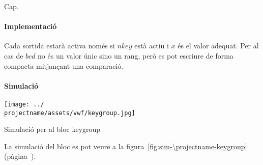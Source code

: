 Cap.

\paragraph{Implementació}




Cada sortida estarà activa només si $nkey$ està actiu i $x$ és el valor adequat.
Per al cas de $bcd$ no és un valor únic sino un rang, però es pot escriure de
forma compacta mitjançant una comparació.

\paragraph{Simulació}

\begin{contendfig}
  \begin{center}
    \texttt{[image: ../\\projectname/assets/vwf/keygroup.jpg]}
  \end{center}
  \caption{\label{fig:sim-\projectname-keygroup} Simulació per al bloc \textsf{keygroup}}
\end{contendfig}

La simulació del bloc es pot veure a la figura~\ref{fig:sim-\projectname-keygroup} (pàgina~\pageref{fig:sim-\projectname-keygroup}).


\vspace{1cm}
